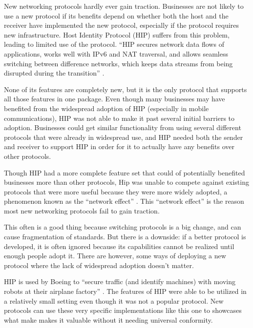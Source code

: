 New networking protocols hardly ever gain traction. Businesses are not likely to use a new protocol if its benefits depend on whether both the host and the receiver have implemented the new protocol, especially if the protocol requires new infrastructure. Host Identity Protocol (HIP) suffers from this problem, leading to limited use of the protocol. ``HIP secures network data flows of applications, works well with IPv6 and NAT traversal, and allows seamless switching between difference networks, which keeps data streams from being disrupted during the transition'' \cite{Leva:2013:ABN:2494664.2494695}. 

None of its features are completely new, but it is the only protocol that supports all those features in one package. Even though many businesses may have benefited from the widespread adoption of HIP (especially in mobile communications), HIP was not able to make it past several initial barriers to adoption. Businesses could get similar functionality from using several different protocols that were already in widespread use, and HIP needed both the sender and receiver to support HIP in order for it to actually have any benefits over other protocols. 

Though HIP had a more complete feature set that could of potentially benefited businesses more than other protocols, Hip was unable to compete against existing protocols that were more useful because they were more widely adopted, a phenomenon known as the  ``network effect''  \cite{Leva:2013:ABN:2494664.2494695}.  This ``network effect'' is the reason most new networking protocols fail to gain traction. 

This often is a good thing because switching protocols is a big change, and can cause fragmentation of standards. But there is a downside: if a better protocol is developed, it is often ignored because its capabilities cannot be realized until enough people adopt it. There are however, some ways of deploying a new protocol where the lack of widespread adoption doesn’t matter. 

HIP is used by Boeing to ``secure traffic (and identify machines) with moving robots at their airplane factory'' 
\cite{Leva:2013:ABN:2494664.2494695}.  The features of HIP were able to be utilized in a relatively small setting even though it was not a popular protocol. New protocols can use these very specific implementations like this one to showcases what make makes it valuable without it needing universal conformity.